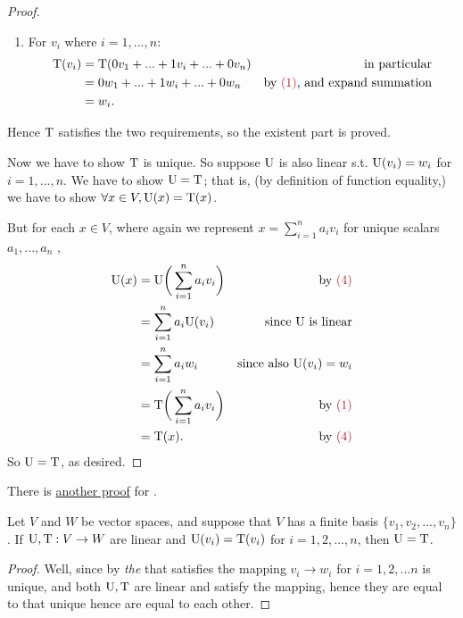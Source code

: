 \begin{proof}
\begin{enumerate}
\item
For \(v_i\) where \(i = 1, ..., n\):
\begin{align*}
    \T(v_i) & = \T(0 v_1 + ... + 1 v_i + ... + 0 v_n) & \text{in particular} \\
            & = 0 w_1 + ... + 1 w_i + ... + 0 w_n & \text{by \MAROON{(1)}, and expand summation} \\
            & = w_i.
\end{align*}
\end{enumerate}
Hence \(\mathrm{T}\) satisfies the two requirements, so the existent part is proved.

Now we have to show \(\mathrm{T}\) is unique.
So suppose \(\mathrm{U}\) is also linear s.t. \(\mathrm{U}(v_i) = w_i\) for \(i = 1, ..., n\).
We have to show \(\mathrm{U} = \mathrm{T}\);
that is, (by definition of function equality,) we have to show \(\forall x \in V, \mathrm{U}(x) = \mathrm{T}(x)\).

But for each \(x \in V\), where again we represent \(x = \sum_{i = 1}^n a_i v_i\) for unique scalars \(a_1, ..., a_n\) ,
\begin{align*}
    \U(x) & = \U\bigg(\sum_{i = 1}^n a_i v_i\bigg) & \text{by \MAROON{(4)}}\\
           & = \sum_{i = 1}^n a_i \U(v_i) & \text{since \(\U\) is linear} \\
           & = \sum_{i = 1}^n a_i w_i & \text{since also \(\U(v_i) = w_i\)} \\
           & = \T\bigg(\sum_{i = 1}^n a_i v_i\bigg) & \text{by \MAROON{(1)}} \\
           & = \T(x). & \text{by \MAROON{(4)}}
\end{align*}
So \(\mathrm{U} = \mathrm{T}\), as desired.
\end{proof}

\begin{note}
There is \href{https://www.youtube.com/watch?v=gAlUekIYKLA&ab_channel=DrPeyam}{another proof} for .
\end{note}

\begin{corollary} \label{corollary 2.6.1}
\sloppy Let \(V\) and \(W\) be vector spaces, and suppose that \(V\) has a finite basis \(\{ v_1, v_2, ..., v_n \}\).
If \(\mathrm{U}, \mathrm{T} : V \to W\) are linear and \(\mathrm{U}(v_i) = \mathrm{T}(v_i)\) for \(i = 1, 2, ..., n\), then \(\mathrm{U} = \mathrm{T}\).
\end{corollary}

\begin{proof}
Well, since by  \emph{the} \LTRAN{} that satisfies the mapping \(v_i \to w_i\) for \(i = 1, 2, ... n\) is unique,
and both \(\mathrm{U}, \mathrm{T}\) are linear and satisfy the mapping, hence they are equal to that unique \LTRAN{} hence are equal to each other.
\end{proof}

